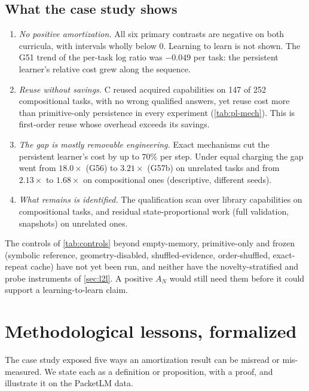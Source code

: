 \documentclass[11pt]{article}
\theoremstyle{remark}
\begin{document}
\subsection{What the case study shows}\label{sec:pl-reading}
\begin{enumerate}[leftmargin=*,itemsep=1pt]
\item \emph{No positive amortization.} All six primary contrasts are negative on both curricula, with intervals wholly below $0$. Learning to learn is not shown. The G51 trend of the per-task log ratio was $-0.049$ per task: the persistent learner's relative cost grew along the sequence.
\item \emph{Reuse without savings.} C reused acquired capabilities on 147 of 252 compositional tasks, with no wrong qualified answers, yet reuse cost more than primitive-only persistence in every experiment (\cref{tab:pl-mech}). This is first-order reuse whose overhead exceeds its savings.
\item \emph{The gap is mostly removable engineering.} Exact mechanisms cut the persistent learner's cost by up to $70\%$ per step. Under equal charging the gap went from $18.0\times$ (G56) to $3.21\times$ (G57b) on unrelated tasks and from $2.13\times$ to $1.68\times$ on compositional ones (descriptive, different seeds).
\item \emph{What remains is identified.} The qualification scan over library capabilities on compositional tasks, and residual state-proportional work (full validation, snapshots) on unrelated ones.
\end{enumerate}
The controls of \cref{tab:controls} beyond empty-memory, primitive-only and frozen (symbolic reference, geometry-disabled, shuffled-evidence, order-shuffled, exact-repeat cache) have not yet been run, and neither have the novelty-stratified and probe instruments of \cref{sec:l2l}. A positive $A_N$ would still need them before it could support a learning-to-learn claim.

\section{Methodological lessons, formalized}\label{sec:lessons}

The case study exposed five ways an amortization result can be misread or mis-measured. We state each as a definition or proposition, with a proof, and illustrate it on the PacketLM data.
\end{document}
